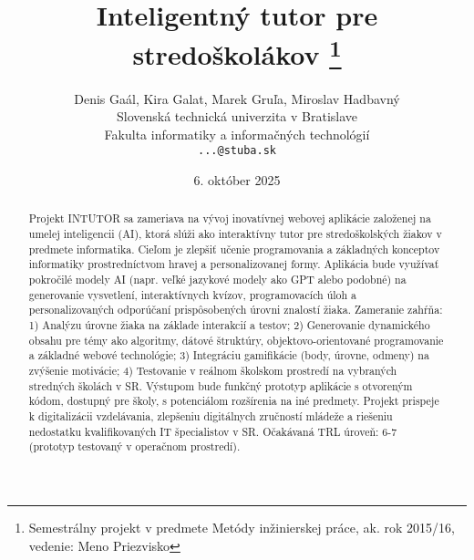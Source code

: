 \documentclass[10pt,twoside,slovak,a4paper]{article}
\title{Inteligentný tutor pre stredoškolákov
\thanks{Semestrálny projekt v predmete Metódy inžinierskej práce, ak. rok 2015/16, vedenie: Meno Priezvisko}} %
\author{Denis Gaál, Kira Galat, Marek Gruľa, Miroslav Hadbavný\\[2pt]
	{\small Slovenská technická univerzita v Bratislave}\\
	{\small Fakulta informatiky a informačných technológií}\\
	{\small \texttt{...@stuba.sk}}
	}
\date{\small 6. október 2025} %
\begin{document}
\maketitle

\begin{abstract}
Projekt INTUTOR sa zameriava na vývoj inovatívnej webovej aplikácie založenej na umelej inteligencii (AI), ktorá slúži ako interaktívny tutor pre stredoškolských žiakov v predmete informatika. Cieľom je zlepšiť učenie programovania a základných konceptov informatiky prostredníctvom hravej a personalizovanej formy. Aplikácia bude využívať pokročilé modely AI (napr. veľké jazykové modely ako GPT alebo podobné) na generovanie vysvetlení, interaktívnych kvízov, programovacích úloh a personalizovaných odporúčaní prispôsobených úrovni znalostí žiaka. Zameranie zahŕňa: 1) Analýzu úrovne žiaka na základe interakcií a testov; 2) Generovanie dynamického obsahu pre témy ako algoritmy, dátové štruktúry, objektovo-orientované programovanie a základné webové technológie; 3) Integráciu gamifikácie (body, úrovne, odmeny) na zvýšenie motivácie; 4) Testovanie v reálnom školskom prostredí na vybraných stredných školách v SR. Výstupom bude funkčný prototyp aplikácie s otvoreným kódom, dostupný pre školy, s potenciálom rozšírenia na iné predmety. Projekt prispeje k digitalizácii vzdelávania, zlepšeniu digitálnych zručností mládeže a riešeniu nedostatku kvalifikovaných IT špecialistov v SR. Očakávaná TRL úroveň: 6-7 (prototyp testovaný v operačnom prostredí).\end{abstract}
\end{document}
